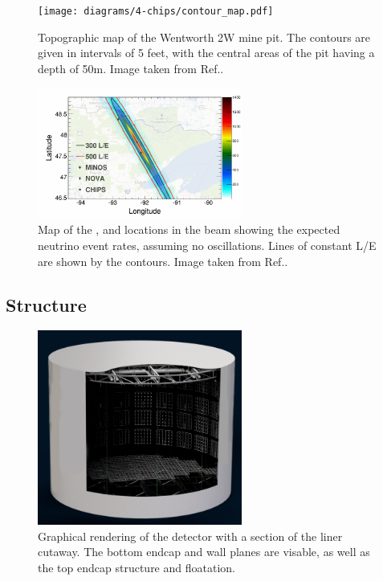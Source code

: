 \begin{figure} %
    \texttt{[image: diagrams/4-chips/contour\_map.pdf]}
    \caption[Topographic map of the Wentworth 2W mine pit.]
    {Topographic map of the Wentworth 2W mine pit. The contours are given in intervals of 5 feet,
        with the central areas of the pit having a depth of 50m. Image taken from
        Ref.\cite{adamson2013}.}
    \label{fig:contour_map}
\end{figure}

\begin{figure} %
    \includegraphics[width=0.6\textwidth]{diagrams/4-chips/numi_map.png}
    \caption[Map of detector locations in the \numi beam.]
    {Map of the \chips, \nova and \minos locations in the \numi beam showing the expected
        neutrino event rates, assuming no oscillations. Lines of constant L/E are shown by the
        contours. Image taken from Ref.\cite{adamson2013}.}
    \label{fig:numi_map}
\end{figure}

\subsection{Structure} %
\label{sec:chips_detector_structure} %

\begin{figure} %
    \includegraphics[width=0.6\textwidth]{diagrams/4-chips/chips_render_1.png}
    \caption[Graphical rendering of the \chipsfive detector with liner cutaway.]
    {Graphical rendering of the \chipsfive detector with a section of the liner cutaway.
        The bottom endcap and wall planes are visable,
        as well as the top endcap structure and floatation.}
    \label{fig:chips_render_1}
\end{figure}

